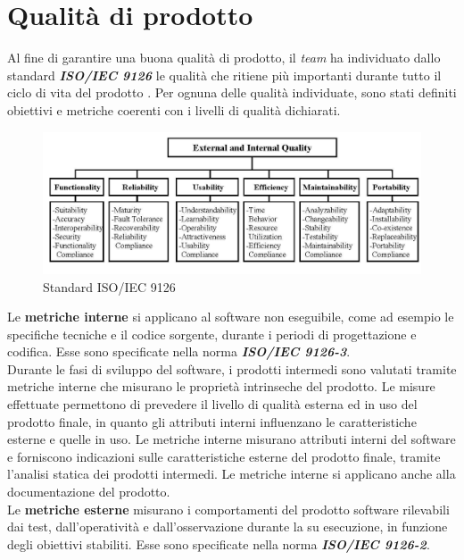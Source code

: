 \newpage
\section{Qualità di prodotto}
	
Al fine di garantire una buona qualità di prodotto, il \textit{team} ha individuato dallo standard \textbf{\textit{ISO/IEC 9126}} le qualità che ritiene più importanti durante tutto il ciclo di vita del prodotto \progetto. Per ognuna delle qualità individuate, sono stati definiti obiettivi e metriche coerenti con i livelli di qualità dichiarati.

\begin{figure}[H]
	\centering
	\includegraphics[scale=0.35]{includes/img/9126.png}
	\caption{Standard ISO/IEC 9126}
\end{figure}

Le \textbf{metriche interne} si applicano al software non eseguibile, come ad esempio le specifiche tecniche e il codice sorgente, durante i periodi di progettazione e codifica.
Esse sono specificate nella norma \textbf{\textit{ISO/IEC 9126-3}}.\\
Durante le fasi di sviluppo del software, i prodotti intermedi sono valutati tramite metriche interne che misurano le proprietà intrinseche del prodotto.
Le misure effettuate permettono di prevedere il livello di qualità esterna ed in uso del prodotto finale, in quanto gli attributi interni influenzano le caratteristiche esterne e quelle in uso.
Le metriche interne misurano attributi interni del software e forniscono indicazioni sulle caratteristiche esterne del prodotto finale, tramite l'analisi statica dei prodotti intermedi.
Le metriche interne si applicano anche alla documentazione del prodotto.\\
Le \textbf{metriche esterne} misurano i comportamenti del prodotto software rilevabili dai test, dall'operatività e dall'osservazione durante la su esecuzione, in funzione degli obiettivi stabiliti.
Esse sono specificate nella norma \textbf{\textit{ISO/IEC 9126-2}}.	


